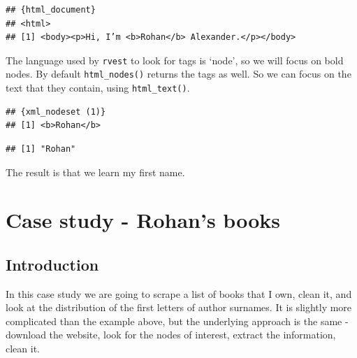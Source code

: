 \documentclass[
]{book}
\newenvironment{Shaded}{\begin{snugshade}}{\end{snugshade}}
\newcommand{\KeywordTok}[1]{\textcolor[rgb]{0.13,0.29,0.53}{\textbf{#1}}}
\newcommand{\NormalTok}[1]{#1}
\newcommand{\OperatorTok}[1]{\textcolor[rgb]{0.81,0.36,0.00}{\textbf{#1}}}
\newcommand{\StringTok}[1]{\textcolor[rgb]{0.31,0.60,0.02}{#1}}
\begin{document}
\begin{verbatim}
## {html_document}
## <html>
## [1] <body><p>Hi, I’m <b>Rohan</b> Alexander.</p></body>
\end{verbatim}

The language used by \texttt{rvest} to look for tags is `node', so we will focus on bold nodes. By default \texttt{html\_nodes()} returns the tags as well. So we can focus on the text that they contain, using \texttt{html\_text()}.

\begin{Shaded}
\end{Shaded}

\begin{verbatim}
## {xml_nodeset (1)}
## [1] <b>Rohan</b>
\end{verbatim}

\begin{Shaded}
\end{Shaded}

\begin{verbatim}
## [1] "Rohan"
\end{verbatim}

The result is that we learn my first name.

\hypertarget{case-study---rohans-books}{%
\section{Case study - Rohan's books}\label{case-study---rohans-books}}

\hypertarget{introduction-9}{%
\subsection{Introduction}\label{introduction-9}}

In this case study we are going to scrape a list of books that I own, clean it, and look at the distribution of the first letters of author surnames. It is slightly more complicated than the example above, but the underlying approach is the same - download the website, look for the nodes of interest, extract the information, clean it.
\end{document}
